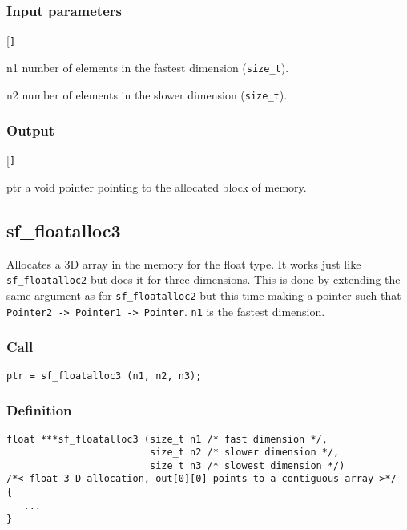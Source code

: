 \subsubsection*{Input parameters}
\begin{desclist}{\tt }{\quad}[\tt ]
   \setlength\itemsep{0pt}
   \item[n1] number of elements in the fastest dimension (\texttt{size\_t}).
   \item[n2] number of elements in the slower dimension (\texttt{size\_t}).
\end{desclist}

\subsubsection*{Output}
\begin{desclist}{\tt }{\quad}[\tt ]
   \setlength\itemsep{0pt}
   \item[ptr] a void pointer pointing to the allocated block of memory.
\end{desclist}




\subsection{{sf\_floatalloc3}}
Allocates a 3D array in the memory for the float type. It works just like \hyperref[sec:sf_floatalloc2]{\texttt{sf\_floatalloc2}} but does it for three dimensions. This is done by extending the same argument as for \texttt{sf\_floatalloc2} but this time making a pointer such that \texttt{Pointer2 -> Pointer1 -> Pointer}. \texttt{n1} is the fastest dimension.


\subsubsection*{Call}
\begin{verbatim}ptr = sf_floatalloc3 (n1, n2, n3);\end{verbatim}

\subsubsection*{Definition}
\begin{verbatim}
float ***sf_floatalloc3 (size_t n1 /* fast dimension */, 
                         size_t n2 /* slower dimension */, 
                         size_t n3 /* slowest dimension */)
/*< float 3-D allocation, out[0][0] points to a contiguous array >*/ 
{
   ...
}
\end{verbatim}

